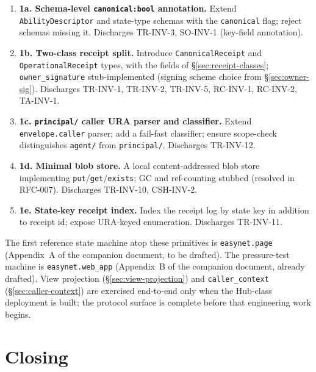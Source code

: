 \documentclass[11pt,a4paper]{article}
\theoremstyle{definition}
\begin{document}
\begin{enumerate}[leftmargin=2.5em,itemsep=0.3em]
    \item \textbf{1a. Schema-level \texttt{canonical:bool}
    annotation.} Extend \texttt{AbilityDescriptor} and state-type
    schemas with the \texttt{canonical} flag; reject schemas
    missing it. Discharges TR-INV-3, SO-INV-1 (key-field
    annotation).

    \item \textbf{1b. Two-class receipt split.} Introduce
    \texttt{CanonicalReceipt} and \texttt{OperationalReceipt}
    types, with the fields of \S\ref{sec:receipt-classes};
    \texttt{owner\_signature} stub-implemented (signing scheme
    choice from \S\ref{sec:owner-sig}). Discharges TR-INV-1,
    TR-INV-2, TR-INV-5, RC-INV-1, RC-INV-2, TA-INV-1.

    \item \textbf{1c. \texttt{principal/} caller URA parser and
    classifier.} Extend \texttt{envelope.caller} parser; add a
    fail-fast classifier; ensure scope-check distinguishes
    \texttt{agent/} from \texttt{principal/}. Discharges TR-INV-12.

    \item \textbf{1d. Minimal blob store.} A local content-addressed
    blob store implementing \texttt{put}/\texttt{get}/\texttt{exists};
    GC and ref-counting stubbed (resolved in RFC-007). Discharges
    TR-INV-10, CSH-INV-2.

    \item \textbf{1e. State-key receipt index.} Index the receipt
    log by state key in addition to receipt id; expose URA-keyed
    enumeration. Discharges TR-INV-11.
\end{enumerate}

The first reference state machine atop these primitives is
\texttt{easynet.page} (Appendix~A of the companion document, to be
drafted). The pressure-test machine is \texttt{easynet.web\_app}
(Appendix~B of the companion document, already drafted). View
projection (\S\ref{sec:view-projection}) and
\texttt{caller\_context} (\S\ref{sec:caller-context}) are exercised
end-to-end only when the Hub-class deployment is built; the
protocol surface is complete before that engineering work begins.

\section{Closing}
\label{sec:closing}
\end{document}
